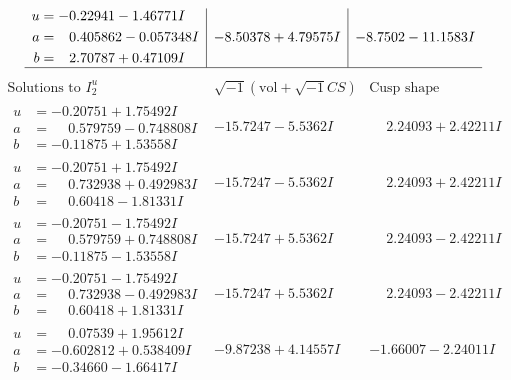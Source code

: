 \documentclass[1p]{elsarticle_modified}
\theoremstyle{definition}
\newcommand{\I}{\sqrt{-1}}
\begin{document}
$$\begin{array}{c|c|c}
\begin{aligned}
u &= -0.22941 - 1.46771 I \\
a &= \phantom{-}0.405862 - 0.057348 I \\
b &= \phantom{-}2.70787 + 0.47109 I\end{aligned}
 & -8.50378 + 4.79575 I & -8.7502 - 11.1583 I\\
 \hline 
 \end{array}$$\newpage$$\begin{array}{c|c|c}  
\text{Solutions to }I^u_{2}& \I (\text{vol} + \sqrt{-1}CS) & \text{Cusp shape}\\
 \hline 
\begin{aligned}
u &= -0.20751 + 1.75492 I \\
a &= \phantom{-}0.579759 - 0.748808 I \\
b &= -0.11875 + 1.53558 I\end{aligned}
 & -15.7247 - 5.5362 I & \phantom{-}2.24093 + 2.42211 I \\ \hline\begin{aligned}
u &= -0.20751 + 1.75492 I \\
a &= \phantom{-}0.732938 + 0.492983 I \\
b &= \phantom{-}0.60418 - 1.81331 I\end{aligned}
 & -15.7247 - 5.5362 I & \phantom{-}2.24093 + 2.42211 I \\ \hline\begin{aligned}
u &= -0.20751 - 1.75492 I \\
a &= \phantom{-}0.579759 + 0.748808 I \\
b &= -0.11875 - 1.53558 I\end{aligned}
 & -15.7247 + 5.5362 I & \phantom{-}2.24093 - 2.42211 I \\ \hline\begin{aligned}
u &= -0.20751 - 1.75492 I \\
a &= \phantom{-}0.732938 - 0.492983 I \\
b &= \phantom{-}0.60418 + 1.81331 I\end{aligned}
 & -15.7247 + 5.5362 I & \phantom{-}2.24093 - 2.42211 I \\ \hline\begin{aligned}
u &= \phantom{-}0.07539 + 1.95612 I \\
a &= -0.602812 + 0.538409 I \\
b &= -0.34660 - 1.66417 I\end{aligned}
 & -9.87238 + 4.14557 I & -1.66007 - 2.24011 I \\ \hline\begin{aligned}

\end{aligned}
\end{array}$$
\end{document}

